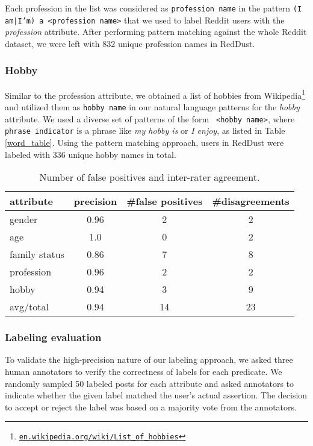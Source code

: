 Each profession in the list was considered as \texttt{\small profession name} in the pattern \texttt{\small (I am|I'm) a <profession name>} that we used to label Reddit users with the \emph{profession} attribute.
After performing pattern matching against the whole Reddit dataset, we were left with 832 unique profession names in RedDust.

\subsubsection{Hobby}
Similar to the profession attribute, we obtained a list of hobbies from Wikipedia\footnote{{\scriptsize \href{https://en.wikipedia.org/wiki/List_of_hobbies}{\texttt{en.wikipedia.org/wiki/List\_of\_hobbies}}}} and 
utilized them as \texttt{\small hobby name} in our natural language patterns for the \emph{hobby} attribute.
We used a diverse set of patterns of the form \texttt{ <hobby name>}, where \texttt{\small phrase indicator} is a phrase like \textit{my hobby is} or \textit{I enjoy}, as listed in Table \ref{word_table}. 
Using the pattern matching approach, users in RedDust were labeled with 336 unique hobby names in total.

\begin{table}[h!]
\centering
\small
\begin{adjustbox}{width=0.60\textwidth}
\begin{tabular}{lccc}
\toprule
\textbf{attribute} & \textbf{precision} & \textbf{\#false positives} & \textbf{\#disagreements} \\
\midrule
gender & 0.96 & 2 & 2 \\
age & 1.0 & 0 & 2 \\
family status & 0.86 & 7 & 8 \\
profession & 0.96 & 2 & 2 \\
hobby & 0.94 & 3 & 9 \\
\midrule
avg/total & 0.94 & 14 & 23 \\
\bottomrule
\end{tabular}
\end{adjustbox}
\caption{Number of false positives and inter-rater agreement.}
\label{agreement}
\end{table}

\subsubsection{Labeling evaluation}
\label{kappa2}
To validate the high-precision nature of our labeling approach, we asked three human annotators 
to verify the correctness of labels for each predicate. We randomly sampled 50 labeled posts for each attribute and asked annotators to indicate whether the given label matched the user's actual assertion. The decision to accept or reject the label was based on a majority vote from the annotators.

